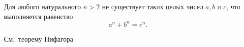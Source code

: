 
\begin{theorem}
    \label{thm:202211081205}
    Для любого натурального $n>2$ не существует таких целых чисел $a,b$ и $c$, что выполняется равенство
    \[
        a^n+b^n=c^n.
    \]
\end{theorem}

\seealso
См.~теорему Пифагора~